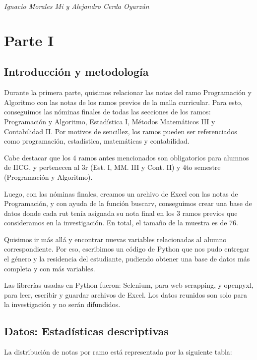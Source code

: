 \documentclass[11pt]{article}
\begin{document}
\textit{Ignacio Morales Mi y Alejandro Cerda Oyarzún}

\newpage

\section{Parte I}

\subsection{Introducción y metodología}

Durante la primera parte, quisimos relacionar las notas del ramo Programación y Algoritmo con las notas de los ramos previos de la malla curricular. Para esto, conseguimos las nóminas finales de todas las secciones de los ramos: Programación y Algoritmo, Estadística I, Métodos Matemáticos III y Contabilidad II. Por motivos de sencillez, los ramos pueden ser referenciados como programación, estadística, matemáticas y contabilidad.

Cabe destacar que los 4 ramos antes mencionados son obligatorios para alumnos de IICG, y pertenecen al 3r (Est. I, MM. III y Cont. II) y 4to semestre (Programación y Algoritmo).

Luego, con las nóminas finales, creamos un archivo de Excel con las notas de Programación, y con ayuda de la función buscarv, conseguimos crear una base de datos donde cada rut tenía asignada su nota final en los 3 ramos previos que consideramos en la investigación. En total, el tamaño de la muestra es de 76.

Quisimos ir más allá y encontrar nuevas variables relacionadas al alumno correspondiente. Por eso, escribimos un código de Python que nos pudo entregar el género y la residencia del estudiante, pudiendo obtener una base de datos más completa y con más variables.

Las librerías usadas en Python fueron: Selenium, para web scrapping, y openpyxl, para leer, escribir y guardar archivos de Excel. Los datos reunidos son solo para la investigación y no serán difundidos.

\subsection{Datos: Estadísticas descriptivas}

La distribución de notas por ramo está representada por la siguiente tabla:
\end{document}

